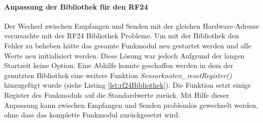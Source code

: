 \paragraph{Anpassung der Bibliothek für den RF24} Der Wechsel zwischen Empfangen und Senden mit der gleichen Hardware-Adresse verursachte mit der RF24 Bibliothek Probleme. Um mit der Bibliothek den Fehler zu beheben hätte das gesamte Funkmodul neu gestartet werden und alle Werte neu initialisiert werden. Diese Lösung war jedoch Aufgrund der langen Startzeit keine Option. Eine Abhilfe konnte geschaffen werden in dem der genutzten Bibliothek eine weitere Funktion \textit{Sensorknoten\_resetRegister()} hinzugefügt wurde (siehe Listing \ref{lst:rf24Bibliothek}). Die Funktion setzt einige Register des Funkmoduls auf die Standardwerte zurück. Mit Hilfe dieser Anpassung kann zwischen Empfangen und Senden problemlos gewechselt werden, ohne dass das komplette Funkmodul zurückgesetzt wird.


